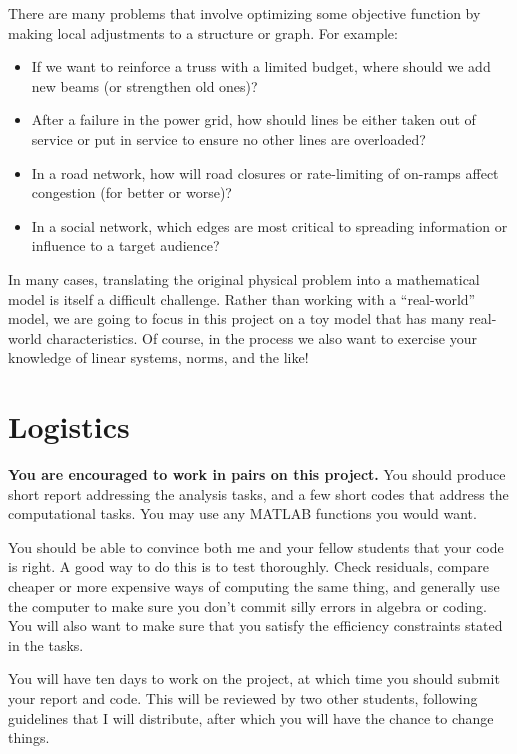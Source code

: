 \documentclass[12pt, leqno]{article}
\begin{document}

There are many problems that involve optimizing some objective
function by making local adjustments to a structure or graph.
For example:
\begin{itemize}
\item If we want to reinforce a truss with a limited budget, where
  should we add new beams (or strengthen old ones)?
\item After a failure in the power grid, how should lines be either
  taken out of service or put in service to ensure no other lines
  are overloaded?
\item In a road network, how will road closures or rate-limiting of
  on-ramps affect congestion (for better or worse)?
\item In a social network, which edges are most critical to
  spreading information or influence to a target audience?
\end{itemize}

In many cases, translating the original physical problem into a
mathematical model is itself a difficult challenge.  Rather than
working with a ``real-world'' model, we are going to focus in this
project on a toy model that has many real-world characteristics.  Of
course, in the process we also want to exercise your knowledge of
linear systems, norms, and the like!

\section*{Logistics}

{\bf You are encouraged to work in pairs on this project.}  You should
produce short report addressing the analysis tasks, and a few
short codes that address the computational tasks.  You may
use any MATLAB functions you would want.

You should be able to convince both me and your fellow students that
your code is right.  A good way to do this is to test thoroughly.
Check residuals, compare cheaper or more expensive ways of computing
the same thing, and generally use the computer to make sure you don't
commit silly errors in algebra or coding.  You will also want to make
sure that you satisfy the efficiency constraints stated in the tasks.

You will have ten days to work on the project, at which time you
should submit your report and code.  This will be reviewed by two
other students, following guidelines that I will distribute, after
which you will have the chance to change things.
\end{document}
